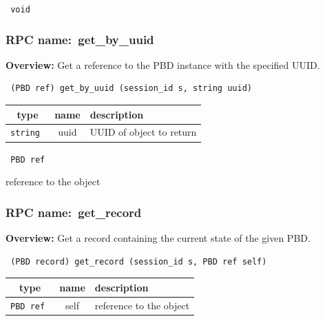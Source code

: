 \vspace{0.3cm}

{\tt 
void
}



\vspace{0.3cm}
\vspace{0.3cm}
\vspace{0.3cm}
\subsubsection{RPC name:~get\_by\_uuid}

{\bf Overview:} 
Get a reference to the PBD instance with the specified UUID.

\begin{verbatim} (PBD ref) get_by_uuid (session_id s, string uuid)\end{verbatim}



 
\vspace{0.3cm}
\begin{tabular}{|c|c|p{7cm}|}
 \hline
{\bf type} & {\bf name} & {\bf description} \\ \hline
{\tt string } & uuid & UUID of object to return \\ \hline 

\end{tabular}

\vspace{0.3cm}

{\tt 
PBD ref
}


reference to the object
\vspace{0.3cm}
\vspace{0.3cm}
\vspace{0.3cm}
\subsubsection{RPC name:~get\_record}

{\bf Overview:} 
Get a record containing the current state of the given PBD.

\begin{verbatim} (PBD record) get_record (session_id s, PBD ref self)\end{verbatim}



 
\vspace{0.3cm}
\begin{tabular}{|c|c|p{7cm}|}
 \hline
{\bf type} & {\bf name} & {\bf description} \\ \hline
{\tt PBD ref } & self & reference to the object \\ \hline 

\end{tabular}

